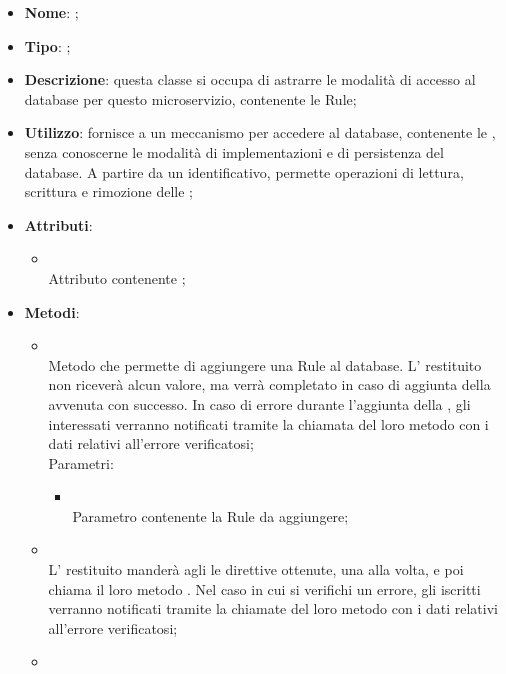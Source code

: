 \begin{itemize}
	\item \textbf{Nome}: ;
	\item \textbf{Tipo}: ;
	\item \textbf{Descrizione}: questa classe si occupa di astrarre le modalità di accesso al database per questo microservizio, contenente le Rule;
	\item \textbf{Utilizzo}: fornisce a  un meccanismo per accedere al database, contenente le , senza conoscerne le modalità di implementazioni e di persistenza del database. A partire da un identificativo, permette operazioni di lettura, scrittura e rimozione delle ;
	\item \textbf{Attributi}:
	\begin{itemize}
		\item[]  \\
		Attributo contenente ;
	\end{itemize}
	\item \textbf{Metodi}:
	\begin{itemize}
		\item[]  \\
		Metodo che permette di aggiungere una Rule al database.  L' restituito non riceverà alcun valore, ma verrà completato in caso di aggiunta della  avvenuta con successo. In caso di errore durante l'aggiunta della , gli  interessati verranno notificati tramite la chiamata del loro metodo  con i dati relativi all'errore verificatosi;\\
		Parametri:
		\begin{itemize}
			\item {} \\
			Parametro contenente la Rule da aggiungere;
		\end{itemize}
		\item[]  \\
		L' restituito manderà agli  le direttive ottenute, una alla volta, e poi chiama il loro metodo . Nel caso in cui si verifichi un errore, gli  iscritti verranno notificati tramite la chiamate del loro metodo  con i dati relativi all'errore verificatosi;\\
		\item[]  \\

\end{itemize}
\end{itemize}
